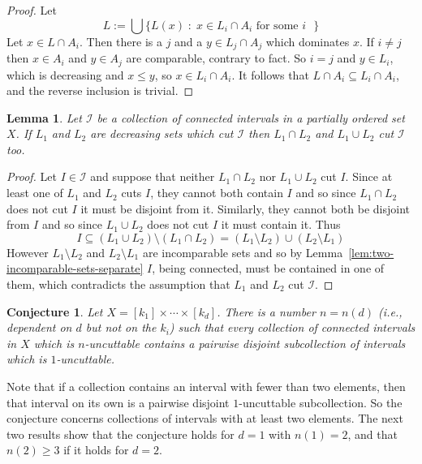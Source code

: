 \documentclass[10pt, a4paper]{article}
\theoremstyle{plain}
\newtheorem{lemma}[theorem]{Lemma}
\newtheorem{conjecture}[theorem]{Conjecture}
\theoremstyle{definition}
\newcommand{\I}{\mathcal{I}}
\begin{document}
\begin{proof}
  Let
  \[
    L := \bigcup\{L(x) \;:\; x\in L_i \cap A_i \text{ for some $i$ } \}
  \]
  Let $x\in L\cap A_i$. Then there is a $j$ and a $y\in L_j\cap A_j$ which dominates $x$.
  If $i\not=j$ then $x\in A_i$ and $y\in A_j$ are comparable, contrary to fact.
  So $i=j$ and $y\in L_i$, which is decreasing and $x\le y$, so $x\in L_i\cap A_i$.
  It follows that $L\cap A_i \subseteq L_i\cap A_i$, and the reverse inclusion
  is trivial.
\end{proof}

\begin{lemma}\label{lem:cup-cap-cuts}
  Let $\I$ be a collection of connected intervals in a partially ordered set $X$.
  If $L_1$ and $L_2$ are decreasing sets which cut $\I$ then $L_1\cap L_2$
  and $L_1\cup L_2$ cut $\I$ too.
\end{lemma}

\begin{proof}
  Let $I\in\I$ and suppose that neither $L_1\cap L_2$ nor $L_1\cup L_2$ cut $I$.
  Since at least one of $L_1$ and $L_2$ cuts $I$, they cannot both contain $I$ and so
  since $L_1\cap L_2$ does not cut $I$ it must be disjoint from it.
  Similarly, they cannot both be disjoint from $I$ and so since $L_1\cup L_2$
  does not cut $I$ it must contain it. Thus
  \[
    I \subseteq (L_1 \cup L_2)\setminus(L_1\cap L_2)
      = (L_1\setminus L_2) \cup (L_2\setminus L_1)
  \]
  However $L_1\setminus L_2$ and $L_2\setminus L_1$ are incomparable sets and so by
  Lemma~\ref{lem:two-incomparable-sets-separate} $I$, being connected, must be contained in
  one of them, which contradicts the assumption that $L_1$ and $L_2$ cut $\I$.
\end{proof}


\begin{conjecture}
  Let $X=[k_1]\times\cdots\times[k_d]$. There is a number $n = n(d)$ (i.e., dependent
  on $d$ but not on the $k_i$) such that every collection of connected intervals in $X$
  which is $n$-uncuttable contains a pairwise disjoint subcollection of intervals which
  is $1$-uncuttable.
\end{conjecture}


Note that if a collection contains an interval with fewer than two elements, then that
interval on its own is a pairwise disjoint $1$-uncuttable subcollection. So the
conjecture concerns collections of intervals with at least two elements. The next two
results show that the conjecture holds for $d=1$ with $n(1)=2$, and that
$n(2)\ge 3$ if it holds for $d=2$.
\end{document}
